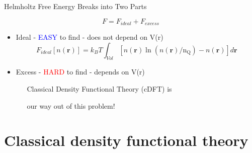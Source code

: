 \documentclass{beamer}
\renewcommand{\vec}[1]{\mathbf{#1}}
\begin{document}
\begin{frame}{Helmholtz Free Energy Breaks into Two Parts}
    \begin{block}{}
        \vspace{-2em}
        \begin{displaymath}F=F_{ideal} + F_{excess}\end{displaymath}
        \vspace{-.7em}        
        \begin{itemize}            
           \item Ideal - \textcolor{blue}{EASY} to find - does not depend on V(r) 
           \begin{displaymath}F_{ideal}[n(\vec{r})]= k_BT\int_{Vol}[n(\vec{r})\ln(n(\vec{r})/\text{n}_\text{Q})-n(\vec{r})]d\vec{r}\end{displaymath}
           \vspace{+0.01em} 
           \item Excess - \textcolor{red}{HARD} to find - depends on V(r) 
           
        \vspace{+1.5em} 
            $~~~~~~~$Classical Density Functional Theory (cDFT) is 
            
            $~~~~~~~$our way out of this problem!
        \end{itemize}
     \end{block}
\end{frame}


\section*{Classical density functional theory}
\end{document}
